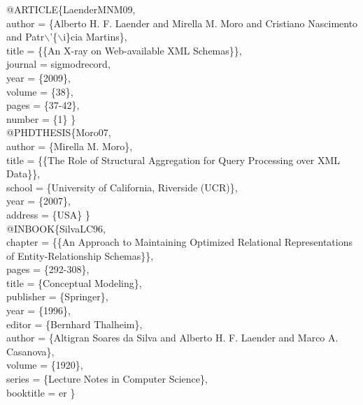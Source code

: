 \documentclass[jidm,a4paper]{jidm} %
\newenvironment{latexcode}
{\ttfamily\vspace{0.1in}\setlength{\parindent}{18pt}}
{\vspace{0.1in}}
\begin{document}
\begin{latexcode}
@ARTICLE\{LaenderMNM09,\\\indent\indent
  author = \{Alberto H. F. Laender and Mirella M. Moro and Cristiano Nascimento\\\indent\indent
	and Patr$\backslash$'\{$\backslash$i\}cia Martins\},\\\indent\indent
  title = \{\{An X-ray on Web-available XML Schemas\}\},\\\indent\indent
  journal = sigmodrecord,\\\indent\indent
  year = \{2009\},\\\indent\indent
  volume = \{38\},\\\indent\indent
  pages = \{37-42\},\\\indent\indent
  number = \{1\} \}\\

@PHDTHESIS\{Moro07,\\\indent\indent
  author = \{Mirella M. Moro\},\\\indent\indent
  title = \{\{The Role of Structural Aggregation for Query Processing over XML Data\}\},\\\indent\indent
  school = \{University of California, Riverside (UCR)\},\\\indent\indent
  year = \{2007\},\\\indent\indent
  address = \{USA\} \}\\

@INBOOK\{SilvaLC96,\\\indent\indent
  chapter = \{\{An Approach to Maintaining Optimized Relational Representations\\\indent\indent
	of Entity-Relationship Schemas\}\},\\\indent\indent
  pages = \{292-308\},\\\indent\indent
  title = \{Conceptual Modeling\},\\\indent\indent
  publisher = \{Springer\},\\\indent\indent
  year = \{1996\},\\\indent\indent
  editor = \{Bernhard Thalheim\},\\\indent\indent
  author = \{Altigran Soares da Silva and Alberto H. F. Laender and Marco A. Casanova\},\\\indent\indent
  volume = \{1920\},\\\indent\indent
  series = \{Lecture Notes in Computer Science\},\\\indent\indent
  booktitle = er \}
  
\end{latexcode}
\end{document}
